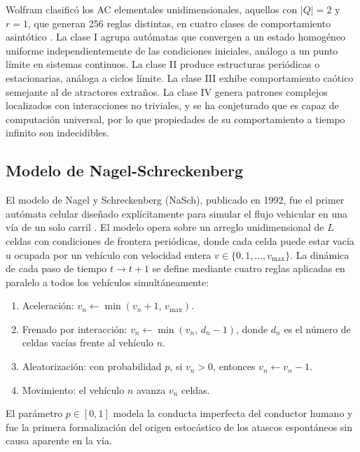 Wolfram clasificó los AC elementales unidimensionales, aquellos con
$|Q| = 2$ y $r = 1$, que generan 256 reglas distintas, en cuatro clases
de comportamiento asintótico \parencite{Wolfram1984}. La clase I agrupa
autómatas que convergen a un estado homogéneo uniforme independientemente
de las condiciones iniciales, análogo a un punto límite en sistemas
continuos. La clase II produce estructuras periódicas o estacionarias,
análoga a ciclos límite. La clase III exhibe comportamiento caótico
semejante al de atractores extraños. La clase IV genera patrones complejos
localizados con interacciones no triviales, y se ha conjeturado que es
capaz de computación universal, por lo que propiedades de su comportamiento
a tiempo infinito son indecidibles.

\subsection{Modelo de Nagel-Schreckenberg}

El modelo de Nagel y Schreckenberg (NaSch), publicado en 1992, fue el
primer autómata celular diseñado explícitamente para simular el flujo
vehicular en una vía de un solo carril \parencite{NagelSchreckenberg1992}.
El modelo opera sobre un arreglo unidimensional de $L$ celdas con
condiciones de frontera periódicas, donde cada celda puede estar vacía
u ocupada por un vehículo con velocidad entera $v \in \{0, 1,
\ldots, v_{\max}\}$. La dinámica de cada paso de tiempo $t \to t+1$ se
define mediante cuatro reglas aplicadas en paralelo a todos los vehículos
simultáneamente:

\begin{enumerate}
  \item Aceleración: $v_n \leftarrow \min(v_n + 1,\, v_{\max})$.
  \item Frenado por interacción: $v_n \leftarrow \min(v_n,\, d_n - 1)$,
        donde $d_n$ es el número de celdas vacías frente al vehículo $n$.
  \item Aleatorización: con probabilidad $p$, si $v_n > 0$, entonces
        $v_n \leftarrow v_n - 1$.
  \item Movimiento: el vehículo $n$ avanza $v_n$ celdas.
\end{enumerate}

El parámetro $p \in [0,1]$ modela la conducta imperfecta del conductor
humano y fue la primera formalización del origen estocástico de los
atascos espontáneos sin causa aparente en la vía.

